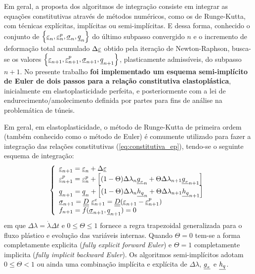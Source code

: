 Em geral, a proposta dos algoritmos de integração consiste em integrar as equações constitutivas através de métodos numéricos, como os de Runge-Kutta, com técnicas explícitas, implícitas ou semi-implícitas. E dessa forma, conhecido o conjunto de $\left\{ \underline{\varepsilon}_n, \underline{\varepsilon}_n^p,\underline \sigma_n,\underline q_n \right\}$ do último subpasso convergido $n$ e o incremento de deformação total acumulado $\Delta \underline{\varepsilon}$ obtido pela iteração de Newton-Raphson, busca-se os valores $\left\{ \underline{\varepsilon}_{n+1}, \underline{\varepsilon}_{n+1}^p,\underline \sigma_{n+1},\underline q_{n+1} \right\}$, plasticamente admissíveis, do subpasso $n+1$. No presente trabalho \textbf{foi implementado um esquema semi-implícito de Euler de dois passos para a relação constitutiva elastoplástica}, inicialmente em elastoplasticidade perfeita, e posteriormente com a lei de endurecimento/amolecimento definida por partes para fins de análise na problemática de túneis.

Em geral, em elastoplasticidade, o método de Runge-Kutta de primeira ordem (também conhecido como o método de Euler) é comumente utilizado para fazer a integração das relações constitutivas (\ref{eq:constitutiva_ep}), tendo-se o seguinte esquema de integração:
\begin{equation}
	\label{eq:esquema_int_constitutiva_ep}
	\left\{
	\begin{array}{lcl}
		\underline{\varepsilon}_{n+1} = \underline{\varepsilon}_n + \Delta \underline{\varepsilon} \\
		\underline{\varepsilon}_{n+1}^p = \underline{\varepsilon}_n^p + \left[(1-\Theta) \Delta \lambda_n \underline{g_{_\sigma}}_n + \Theta \Delta \lambda_{n+1} \underline{g_{_\sigma}}_{n+1}\right] \\
		\underline q_{n+1} = \underline q_n + \left[(1-\Theta) \Delta \lambda_n \underline{h_q}_n + \Theta \Delta \lambda_{n+1} \underline{h_q}_{n+1}\right] \\	
		\underline \sigma_{n+1} = \underline{\underline D}~\underline{\varepsilon}_{n+1}^e = \underline{\underline D}( \underline{\varepsilon}_{n+1} - \underline{\varepsilon}_{n+1}^p) \\
		f_{n+1} = f(\underline \sigma_{n+1},\underline q_{n+1}) = 0		
	\end{array}
	\right.
\end{equation}
em que $\Delta \lambda = \dot\lambda\Delta t$ e $0 \leq \Theta \leq 1$ fornece a regra trapezoidal generalizada para o fluxo plástico e evolução das variáveis internas. Quando $\Theta = 0$ tem-se a forma completamente explicita (\textit{fully explicit forward Euler}) e $\Theta = 1$  completamente implicita (\textit{fully implicit backward Euler}). Os algoritmos semi-implícitos adotam $0 \leq \Theta < 1$  ou ainda uma combinação implícita e explícita de $\Delta \lambda$, $\underline{g_{_\sigma}}$ e $\underline{h_q}$.

